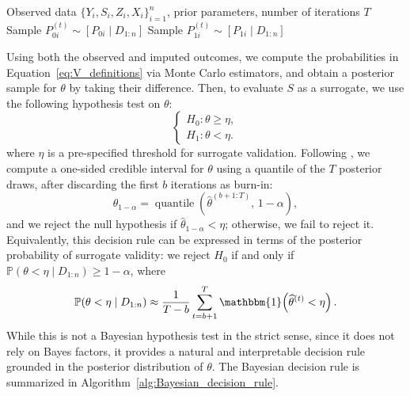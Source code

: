 \documentclass[referee,usenatbib]{biom}
\newcommand{\Prob}{\mathbb{P}}
\newcommand{\one}{\mathbbm{1}}
\begin{document}
\begin{algorithm}[htbp!]
\caption{Bayesian Imputation-Based Approach.}
\label{alg:Bayesian_imputation}
\begin{algorithmic}[1]
\Require Observed data \(\{Y_i, S_i, Z_{i}, X_{i}\}_{i=1}^n\), prior parameters, number of iterations \(T\)
            \State Sample \(P^{(t)}_{0i} \sim \left[ P_{0i} \mid D_{1:n} \right]\)
        \Else
            \State Sample \(P^{(t)}_{1i} \sim \left[ P_{1i} \mid D_{1:n} \right]\)
        \EndIf
    \EndFor
\EndFor
\end{algorithmic}
\end{algorithm}

Using both the observed and imputed outcomes, we compute the probabilities in Equation~\eqref{eq:V_definitions} via Monte Carlo estimators, and obtain a posterior sample for \(\theta\) by taking their difference. Then, to evaluate \(S\) as a surrogate, we use the following hypothesis test on \(\theta\):
\begin{equation}
    \label{eq:hypothesis_test_theta}
    \begin{cases}
        H_{0}: \theta \geq \eta, \\
        H_{1}: \theta < \eta.
    \end{cases}
\end{equation}
where \(\eta\) is a pre-specified threshold for surrogate validation. Following \citet{parast2024rank}, we compute a one-sided credible interval for \(\theta\) using a quantile of the \(T\) posterior draws, after discarding the first \(b\) iterations as burn-in:
\begin{equation*}
    \widehat{\theta}_{1 - \alpha}
    = \operatorname{quantile}\!\left( \widehat{\theta}^{(b+1:T)},\, 1 - \alpha \right),
\end{equation*}
and we reject the null hypothesis if \(\widehat{\theta}_{1 - \alpha} < \eta\); otherwise, we fail to reject it. Equivalently, this decision rule can be expressed in terms of the posterior probability of surrogate validity: we reject \(H_0\) if and only if \(\Prob(\theta < \eta \mid D_{1:n}) \geq 1 - \alpha\), where
\begin{equation*}
    \Prob(\theta < \eta \mid D_{1:n}) \approx \frac{1}{T - b} \sum_{t=b+1}^{T} \one\!\left(\widehat{\theta}^{(t)} < \eta\right).
\end{equation*}
While this is not a Bayesian hypothesis test in the strict sense, since it does not rely on Bayes factors, it provides a natural and interpretable decision rule grounded in the posterior distribution of \(\theta\). The Bayesian decision rule is summarized in Algorithm~\ref{alg:Bayesian_decision_rule}.
\end{document}
